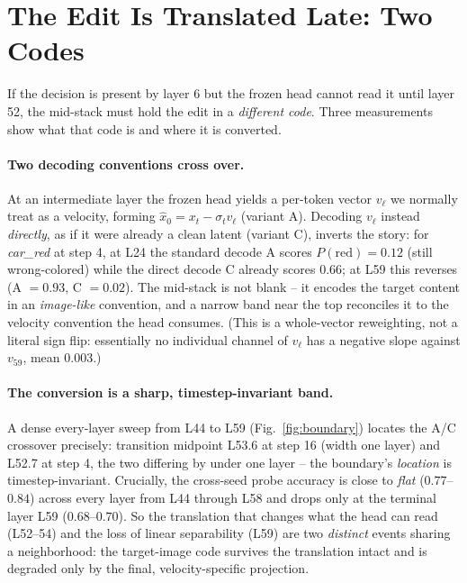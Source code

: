 \section{The Edit Is Translated Late: Two Codes}\label{sec:translate}

If the decision is present by layer 6 but the frozen head cannot read it
until layer 52, the mid-stack must hold the edit in a \emph{different
code}. Three measurements show what that code is and where it is
converted.

\paragraph{Two decoding conventions cross over.} At an intermediate layer
the frozen head yields a per-token vector $v_\ell$ we normally treat as a
velocity, forming $\hat x_0 = x_t - \sigma_t v_\ell$ (variant A). Decoding
$v_\ell$ instead \emph{directly}, as if it were already a clean latent
(variant C), inverts the story: for \emph{car\_red} at step 4, at L24 the
standard decode A scores $P(\text{red}){=}0.12$ (still wrong-colored)
while the direct decode C already scores $0.66$; at L59 this reverses (A
$=0.93$, C $=0.02$). The mid-stack is not blank -- it encodes the target
content in an \emph{image-like} convention, and a narrow band near the top
reconciles it to the velocity convention the head consumes. (This is a
whole-vector reweighting, not a literal sign flip: essentially no
individual channel of $v_\ell$ has a negative slope against $v_{59}$, mean
$0.003$.)

\paragraph{The conversion is a sharp, timestep-invariant band.} A dense
every-layer sweep from L44 to L59 (Fig.~\ref{fig:boundary}) locates the
A/C crossover precisely: transition midpoint L53.6 at step 16 (width one
layer) and L52.7 at step 4, the two differing by under one layer -- the
boundary's \emph{location} is timestep-invariant. Crucially, the
cross-seed probe accuracy is close to \emph{flat} ($0.77$--$0.84$) across
every layer from L44 through L58 and drops only at the terminal layer L59
($0.68$--$0.70$). So the translation that changes what the head can read
(L52--54) and the loss of linear separability (L59) are two \emph{distinct}
events sharing a neighborhood: the target-image code survives the
translation intact and is degraded only by the final, velocity-specific
projection.

